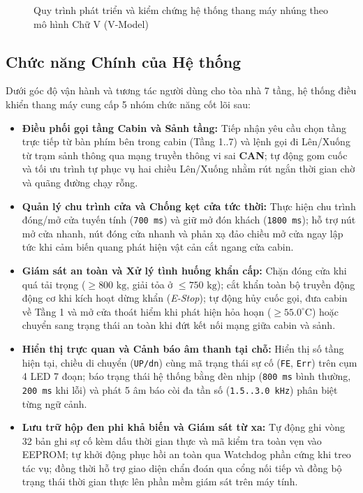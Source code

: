 \begin{figure}[H]
\centering

\caption{Quy trình phát triển và kiểm chứng hệ thống thang máy nhúng theo mô hình Chữ V (V-Model)}
\label{fig:vmodel}
\end{figure}

\subsection{Chức năng Chính của Hệ thống}
Dưới góc độ vận hành và tương tác người dùng cho tòa nhà 7 tầng, hệ thống điều khiển thang máy cung cấp 5 nhóm chức năng cốt lõi sau:
\begin{itemize}[nosep]
    \item \textbf{Điều phối gọi tầng Cabin và Sảnh tầng:} Tiếp nhận yêu cầu chọn tầng trực tiếp từ bàn phím bên trong cabin (Tầng 1..7) và lệnh gọi đi Lên/Xuống từ trạm sảnh thông qua mạng truyền thông vi sai \textbf{CAN}; tự động gom cuốc và tối ưu trình tự phục vụ hai chiều Lên/Xuống nhằm rút ngắn thời gian chờ và quãng đường chạy rỗng.
    \item \textbf{Quản lý chu trình cửa và Chống kẹt cửa tức thời:} Thực hiện chu trình đóng/mở cửa tuyến tính (\texttt{700~ms}) và giữ mở đón khách (\texttt{1800~ms}); hỗ trợ nút mở cửa nhanh, nút đóng cửa nhanh và phản xạ đảo chiều mở cửa ngay lập tức khi cảm biến quang phát hiện vật cản cắt ngang cửa cabin.
    \item \textbf{Giám sát an toàn và Xử lý tình huống khẩn cấp:} Chặn đóng cửa khi quá tải trọng ($\ge 800\text{ kg}$, giải tỏa ở $\le 750\text{ kg}$); cắt khẩn toàn bộ truyền động động cơ khi kích hoạt dừng khẩn (\textit{E-Stop}); tự động hủy cuốc gọi, đưa cabin về Tầng 1 và mở cửa thoát hiểm khi phát hiện hỏa hoạn ($\ge 55.0^\circ\text{C}$) hoặc chuyển sang trạng thái an toàn khi đứt kết nối mạng giữa cabin và sảnh.
    \item \textbf{Hiển thị trực quan và Cảnh báo âm thanh tại chỗ:} Hiển thị số tầng hiện tại, chiều di chuyển (\texttt{UP/dn}) cùng mã trạng thái sự cố (\texttt{FE}, \texttt{Err}) trên cụm 4 LED 7 đoạn; báo trạng thái hệ thống bằng đèn nhịp (\texttt{800~ms} bình thường, \texttt{200~ms} khi lỗi) và phát 5 âm báo còi đa tần số (\texttt{1.5..3.0~kHz}) phân biệt từng ngữ cảnh.
    \item \textbf{Lưu trữ hộp đen phi khả biến và Giám sát từ xa:} Tự động ghi vòng 32 bản ghi sự cố kèm dấu thời gian thực và mã kiểm tra toàn vẹn vào EEPROM; tự khởi động phục hồi an toàn qua Watchdog phần cứng khi treo tác vụ; đồng thời hỗ trợ giao diện chẩn đoán qua cổng nối tiếp và đồng bộ trạng thái thời gian thực lên phần mềm giám sát trên máy tính.
\end{itemize}

